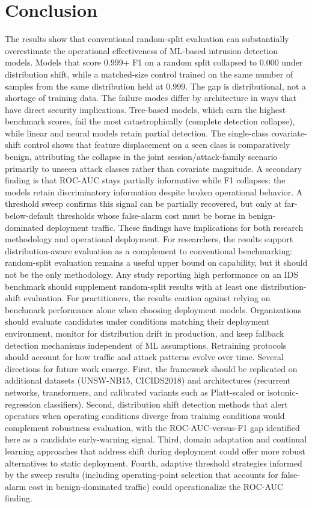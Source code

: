 \documentclass[10pt]{article}
\begin{document}
\section{Conclusion}
The results show that conventional random-split evaluation can substantially overestimate the operational effectiveness of ML-based intrusion detection models. Models that score 0.999+ F1 on a random split collapsed to 0.000 under distribution shift, while a matched-size control trained on the same number of samples from the same distribution held at 0.999. The gap is distributional, not a shortage of training data.
The failure modes differ by architecture in ways that have direct security implications. Tree-based models, which earn the highest benchmark scores, fail the most catastrophically (complete detection collapse), while linear and neural models retain partial detection. The single-class covariate-shift control shows that feature displacement on a seen class is comparatively benign, attributing the collapse in the joint session/attack-family scenario primarily to unseen attack classes rather than covariate magnitude. A secondary finding is that ROC-AUC stays partially informative while F1 collapses: the models retain discriminatory information despite broken operational behavior. A threshold sweep confirms this signal can be partially recovered, but only at far-below-default thresholds whose false-alarm cost must be borne in benign-dominated deployment traffic.
These findings have implications for both research methodology and operational deployment. For researchers, the results support distribution-aware evaluation as a complement to conventional benchmarking: random-split evaluation remains a useful upper bound on capability, but it should not be the only methodology. Any study reporting high performance on an IDS benchmark should supplement random-split results with at least one distribution-shift evaluation. For practitioners, the results caution against relying on benchmark performance alone when choosing deployment models. Organizations should evaluate candidates under conditions matching their deployment environment, monitor for distribution drift in production, and keep fallback detection mechanisms independent of ML assumptions. Retraining protocols should account for how traffic and attack patterns evolve over time.
Several directions for future work emerge. First, the framework should be replicated on additional datasets (UNSW-NB15, CICIDS2018) and architectures (recurrent networks, transformers, and calibrated variants such as Platt-scaled or isotonic-regression classifiers). Second, distribution shift detection methods that alert operators when operating conditions diverge from training conditions would complement robustness evaluation, with the ROC-AUC-versus-F1 gap identified here as a candidate early-warning signal. Third, domain adaptation and continual learning approaches that address shift during deployment could offer more robust alternatives to static deployment. Fourth, adaptive threshold strategies informed by the sweep results (including operating-point selection that accounts for false-alarm cost in benign-dominated traffic) could operationalize the ROC-AUC finding.
\end{document}
